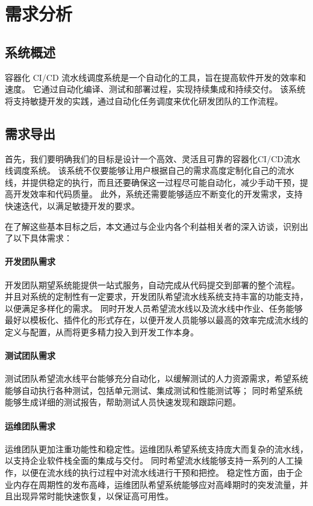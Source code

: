 
\chapter{需求分析}

\section{系统概述}
容器化 CI/CD 流水线调度系统是一个自动化的工具，旨在提高软件开发的效率和速度。
它通过自动化编译、测试和部署过程，实现持续集成和持续交付。
该系统将支持敏捷开发的实践，通过自动化任务调度来优化研发团队的工作流程。
\section{需求导出}

首先，我们要明确我们的目标是设计一个高效、灵活且可靠的容器化CI/CD流水线调度系统。
该系统不仅要能够让用户根据自己的需求高度定制化自己的流水线，并提供稳定的执行，而且还要确保这一过程尽可能自动化，减少手动干预，提高开发效率和代码质量。
此外，系统还需要能够适应不断变化的开发需求，支持快速迭代，以满足敏捷开发的要求。

在了解这些基本目标之后，本文通过与企业内各个利益相关者的深入访谈，识别出了以下具体需求：

\subsubsection{开发团队需求}
开发团队期望系统能提供一站式服务，自动完成从代码提交到部署的整个流程。
并且对系统的定制性有一定要求，开发团队希望流水线系统支持丰富的功能支持，以便满足多样化的需求。
同时开发人员希望流水线以及流水线中作业、任务能够最好以模板化、插件化的形式存在，以便开发人员能够以最高的效率完成流水线的定义与配置，从而将更多精力投入到开发工作本身。

\subsubsection{测试团队需求}
测试团队希望流水线平台能够充分自动化，以缓解测试的人力资源需求，希望系统能够自动执行各种测试，包括单元测试、集成测试和性能测试等；
同时希望系统能够生成详细的测试报告，帮助测试人员快速发现和跟踪问题。

\subsubsection{运维团队需求}
运维团队更加注重功能性和稳定性。运维团队希望系统支持庞大而复杂的流水线，以支持企业软件栈全面的集成与交付。
同时希望流水线能够支持一系列的人工操作，以便在流水线的执行过程中对流水线进行干预和把控。
稳定性方面，由于企业内存在周期性的发布高峰，运维团队希望系统能够应对高峰期时的突发流量，并且出现异常时能快速恢复，以保证高可用性。


